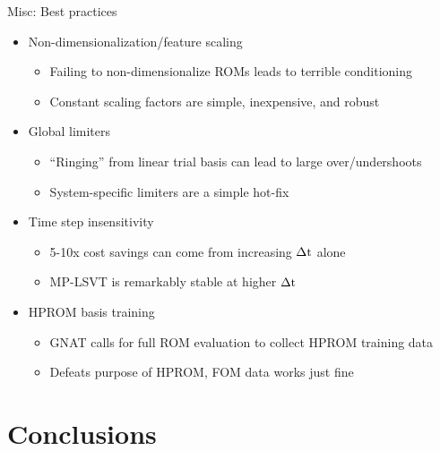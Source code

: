 \documentclass[]{beamer}
\begin{document}
\begin{frame}{Misc: Best practices}
	\begin{itemize}
		\item Non-dimensionalization/feature scaling
		\begin{itemize}
			\item Failing to non-dimensionalize ROMs leads to terrible conditioning
			\item Constant scaling factors are simple, inexpensive, and robust
		\end{itemize}
		\item Global limiters
		\begin{itemize}
			\item ``Ringing'' from linear trial basis can lead to large over/undershoots
			\item System-specific limiters are a simple hot-fix
		\end{itemize}
		\item Time step insensitivity
		\begin{itemize}
			\item 5-10x cost savings can come from increasing $\Delta \text{t}$ alone
			\item MP-LSVT is remarkably stable at higher $\Delta \text{t}$
		\end{itemize}
		\item HPROM basis training
		\begin{itemize}
			\item GNAT calls for full ROM evaluation to collect HPROM training data
			\item Defeats purpose of HPROM, FOM data works just fine
		\end{itemize}
	\end{itemize}
\end{frame}

\section*{Conclusions}
\end{document}
